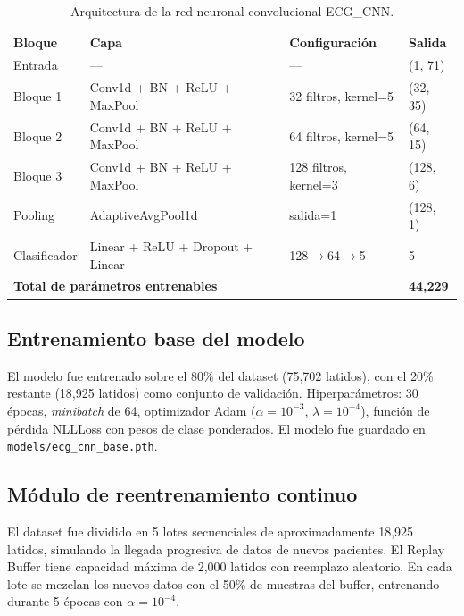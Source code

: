 \documentclass[11pt,spanish]{citedi}
\begin{document}
\begin{table}[h]
\caption{Arquitectura de la red neuronal convolucional ECG\_CNN.}
\label{T_arquitectura}
\begin{center}
\begin{tabular}{llll}
\toprule
\textbf{Bloque} & \textbf{Capa} & \textbf{Configuración} & \textbf{Salida} \\
\midrule
Entrada      & ---                              & ---                   & (1, 71)   \\
Bloque 1     & Conv1d + BN + ReLU + MaxPool     & 32 filtros, kernel=5  & (32, 35)  \\
Bloque 2     & Conv1d + BN + ReLU + MaxPool     & 64 filtros, kernel=5  & (64, 15)  \\
Bloque 3     & Conv1d + BN + ReLU + MaxPool     & 128 filtros, kernel=3 & (128, 6)  \\
Pooling      & AdaptiveAvgPool1d                & salida=1              & (128, 1)  \\
Clasificador & Linear + ReLU + Dropout + Linear & 128$\to$64$\to$5     & 5         \\
\midrule
\multicolumn{3}{l}{\textbf{Total de parámetros entrenables}} & \textbf{44,229} \\
\bottomrule
\end{tabular}
\end{center}
\end{table}

\subsection{Entrenamiento base del modelo}

El modelo fue entrenado sobre el 80\% del dataset (75,702 latidos), con el 20\% restante (18,925 latidos) como conjunto de validación. Hiperparámetros: 30 épocas, \textit{minibatch} de 64, optimizador Adam ($\alpha = 10^{-3}$, $\lambda = 10^{-4}$), función de pérdida NLLLoss con pesos de clase ponderados. El modelo fue guardado en \texttt{models/ecg\_cnn\_base.pth}.

\subsection{Módulo de reentrenamiento continuo}

El dataset fue dividido en 5 lotes secuenciales de aproximadamente 18,925 latidos, simulando la llegada progresiva de datos de nuevos pacientes. El Replay Buffer tiene capacidad máxima de 2,000 latidos con reemplazo aleatorio. En cada lote se mezclan los nuevos datos con el 50\% de muestras del buffer, entrenando durante 5 épocas con $\alpha = 10^{-4}$.
\end{document}
